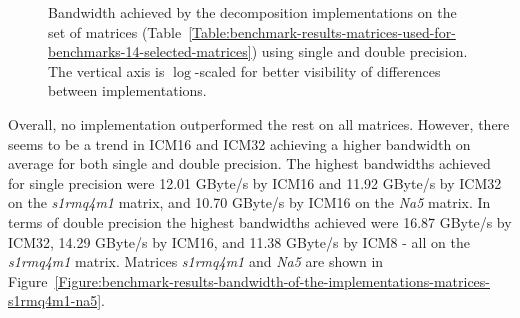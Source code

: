 \begin{figure}[ht!]
\begin{subfigure}{\textwidth}
	\end{subfigure}
	\caption{Bandwidth achieved by the decomposition implementations on the set of matrices (Table~\ref{Table:benchmark-results-matrices-used-for-benchmarks-14-selected-matrices}) using single and double precision. The vertical axis is $ \log $-scaled for better visibility of differences between implementations.}
	\label{Graph:benchmark-results-bandwidth-of-the-implementations-single-double-precision}
\end{figure}

Overall, no implementation outperformed the rest on all matrices. However, there seems to be a trend in ICM16 and ICM32 achieving a higher bandwidth on average for both single and double precision. The highest bandwidths achieved for single precision were 12.01 GByte/s by ICM16 and 11.92 GByte/s by ICM32 on the \textit{s1rmq4m1} matrix, and 10.70 GByte/s by ICM16 on the \textit{Na5} matrix. In terms of double precision the highest bandwidths achieved were 16.87 GByte/s by ICM32, 14.29 GByte/s by ICM16, and 11.38 GByte/s by ICM8 - all on the \textit{s1rmq4m1} matrix. Matrices \textit{s1rmq4m1} and \textit{Na5} are shown in Figure~\ref{Figure:benchmark-results-bandwidth-of-the-implementations-matrices-s1rmq4m1-na5}.

